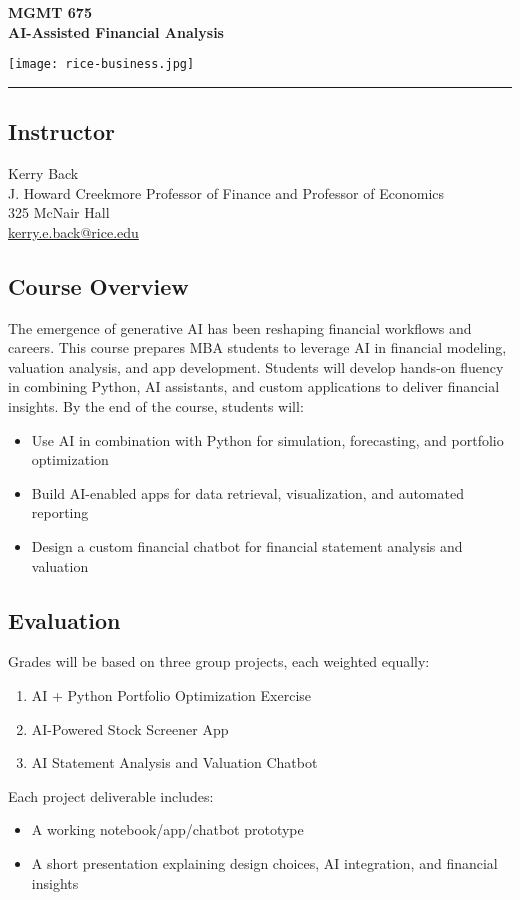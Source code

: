 \documentclass[11pt]{article}
\begin{document}
\begin{minipage}[c][3cm][c]{0.5\textwidth}
\Large\textbf{MGMT 675\\ AI-Assisted Financial Analysis}
\end{minipage}
\hfill
\begin{minipage}[c][3cm][c]{0.4\textwidth}
\texttt{[image: rice-business.jpg]}
\end{minipage}

\vspace{1cm}
\hrule
\subsection*{Instructor}
Kerry Back\\
J. Howard Creekmore Professor of Finance and Professor of Economics\\
325 McNair Hall\\
\href{mailto:kerry.e.back@rice.edu}{kerry.e.back@rice.edu}

\subsection*{Course Overview}

The emergence of generative AI has been reshaping financial workflows and careers. This course prepares MBA students to leverage AI in financial modeling, valuation analysis, and app development. Students will develop hands-on fluency in combining Python, AI assistants, and custom applications to deliver financial insights.  By the end of the course, students will:

\begin{itemize}\setlength{\itemsep}{0pt}
\item Use AI in combination with Python for simulation, forecasting, and portfolio optimization
\item Build AI-enabled apps for data retrieval, visualization, and automated reporting
\item Design a custom financial chatbot for financial statement analysis and valuation
\end{itemize}

\subsection*{Evaluation}

Grades will be based on three group projects, each weighted equally:
\begin{enumerate}\setlength{\itemsep}{0pt}
\item AI + Python Portfolio Optimization Exercise 
\item AI-Powered Stock Screener App 
\item AI Statement Analysis and Valuation Chatbot 
\end{enumerate}
Each project deliverable includes:
\begin{itemize}\setlength{\itemsep}{0pt}
\item A working notebook/app/chatbot prototype
\item A short presentation explaining design choices, AI integration, and financial insights
\end{itemize}
\end{document}
